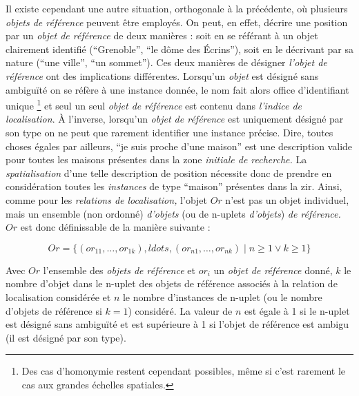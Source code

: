 Il existe cependant une autre situation, orthogonale à la précédente,
où plusieurs \emph{objets de référence} peuvent être employés. On
peut, en effet, décrire une position par un \emph{objet de référence}
de deux manières : soit en se référant à un objet clairement identifié
(\eg \enquote{Grenoble}, \enquote{le dôme des Écrins}), soit en le
décrivant par sa nature (\eg \enquote{une ville}, \enquote{un
  sommet}). Ces deux manières de désigner \emph{l'objet de référence}
ont des implications différentes. Lorsqu'un \emph{objet} est désigné
sans ambiguïté on se réfère à une instance donnée, le nom fait alors
office d'identifiant unique \footnote{Des cas d’homonymie restent
  cependant possibles, même si c'est rarement le cas aux grandes
  échelles spatiales.} et seul un seul \emph{objet de référence} est
contenu dans \emph{l'indice de localisation}. À l'inverse, lorsqu'un
\emph{objet de référence} est uniquement désigné par son type on ne
peut que rarement identifier une instance précise. Dire, toutes choses
égales par ailleurs, \enquote{je suis proche d'une maison} est une
description valide pour toutes les maisons présentes dans la zone
\emph{initiale de recherche.} La \emph{spatialisation} d'une telle
description de position nécessite donc de prendre en considération
toutes les \emph{instances} de type \enquote{maison} présentes dans la
\ac{zir}. Ainsi, comme pour les \emph{relations de localisation,}
l'objet \(Or\) n'est pas un objet individuel, mais un ensemble (non
ordonné) \emph{d'objets} (ou de n-uplets \emph{d'objets}) \emph{de
  référence.} \(Or\) est donc définissable de la manière suivante :

\begin{equation}
  Or = \{(or_{11}, \ldots,  or_{1k}), ldots, (or_{n1}, \ldots,
  or_{nk}) \mid  n ≥ 1 \vee k ≥ 1\}
\end{equation}

Avec \(Or\) l'ensemble des \emph{objets de référence} et \(or_i\) un
\emph{objet de référence} donné, \(k\) le nombre d'objet dans le
n-uplet des objets de référence associés à la relation de localisation
considérée et \(n\) le nombre d'instances de n-uplet (ou le nombre
d'objets de référence si $k=1$) considéré. La valeur de \(n\) est
égale à 1 si le n-uplet est désigné sans ambiguïté et est supérieure à
1 si l'objet de référence est ambigu (\eg il est désigné par son
type).


